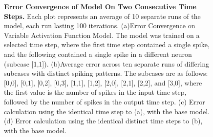 \documentclass[11pt,titlepage]{article}
\begin{document}
\begin{figure}[H]
\caption[Error Convergence of Model On Two Consecutive Time Steps.]{\textbf{Error Convergence of Model On Two Consecutive Time Steps.} Each plot represents an average of 10 separate runs of the model, each run lasting 100 iterations. (a)Error Convergence on Variable Activation Function Model. The model was trained on a selected time step, where the first time step contained a single spike, and the following contained a single spike in a different neuron (subcase [1,1]). (b)Average error across ten separate runs of differing subcases with distinct spiking patterns. The subcases are as follows: [0,0], [0,1], [0,2], [0,3], [1,1], [1,2], [2,0], [2,1], [2,2], and [3,0], where the first value is the number of spikes in the input time step, followed by the number of spikes in the output time step. (c) Error calculation using the identical time step to (a), with the base model.(d) Error calculation using the identical distinct time steps to (b), with the base model.}
\label{fig:errorTwoTime}
\end{figure}

\clearpage
\end{document}
